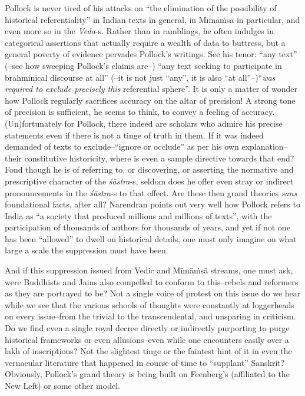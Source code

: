 Pollock is never tired of his attacks on “the elimination of the possibility of historical referentiality” in Indian texts in general, in Mīmāṁsā in particular, and even more so in the \textit{Veda}-s. Rather than in ramblings, he often indulges in categorical assertions that actually require a wealth of data to buttress, but a general poverty of evidence pervades Pollock’s writings. See his tenor: “any text” (–see how sweeping Pollock’s claims are–) “any text seeking to participate in brahminical discourse at all” (–it is not just “any”, it is also “at all”–)\break “\textit{was required to exclude precisely this} referential sphere”. It is only a matter of wonder how Pollock regularly sacrifices accuracy on the altar of precision! A strong tone of precision is sufficient, he seems to think, to convey a feeling of accuracy. (Un)fortunately for Pollock, there indeed are scholars who admire his precise statements even if there is not a tinge of truth in them. If it was indeed demanded of texts to exclude–“ignore or occlude” as per his own explanation–their constitutive historicity, where is even a sample directive towards that end? Fond though he is of referring to, or discovering, or asserting the normative and prescriptive character of the \textit{śāstra}-s, seldom does he offer even stray or indirect pronouncements in the \textit{śāstra}-s to that effect. Are these then grand theories \textit{sans} foundational facts, after all? Narendran points out very well how Pollock refers to India as “a society that produced millions and millions of texts”, with the participation of thousands of authors for thousands of years, and yet if not one has been “allowed” to dwell on historical details, one must only imagine on what large a scale the suppression must have been.

And if this suppression issued from Vedic and Mīmāṁsā streams, one must ask, were Buddhists and Jains also compelled to conform to this–rebels and reformers as they are portrayed to be? Not a single voice of protest on this issue do we hear while we see that the various schools of thoughts were constantly at loggerheads on every issue–from the trivial to the transcendental, and unsparing in criticism. Do we find even a single royal decree directly or indirectly purporting to purge historical frameworks or even allusions–even while one encounters easily over a lakh of inscriptions? Not the slightest tinge or the faintest hint of it in even the vernacular literature that happened in course of time to “supplant” Sanskrit? Obviously, Pollock’s grand theory is being built on Feenberg’s (affiliated to the New Left) or some other model.


